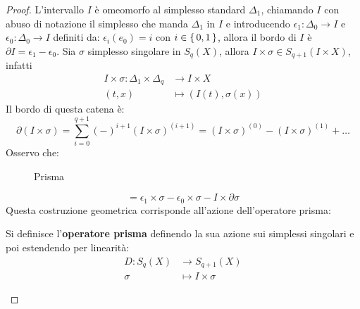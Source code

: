 \begin{proof}
  L'intervallo $ I $ è omeomorfo al simplesso standard $ \Delta_1 $, chiamando
  $ I $ con abuso di notazione il simplesso che manda $ \Delta_1 $ in $ I $ e
  introducendo $ \epsilon_1 \colon \Delta_0 \to I $ e
  $ \epsilon_0 \colon \Delta_0 \to I $ definiti da: $ \epsilon_i(e_0) = i $ con
  $ i \in \set{0,1} $, allora il bordo di $ I $ è
  $ \partial I = \epsilon_1 - \epsilon_0 $. Sia $ \sigma $ simplesso singolare in
  $ S_q(X) $, allora $ I \times \sigma \in S_{q+1}(I \times X) $, infatti
  \begin{align*}
    I \times \sigma \colon \Delta_1 \times \Delta_q & \to I \times X \\
    (t,x) & \mapsto (I(t), \sigma(x))
  \end{align*}
  Il bordo di questa catena è:
  \[
    \partial (I \times \sigma) = \sum_{i=0}^{q+1} (-)^{i+1}(I \times \sigma)^{(i+1)} = (I \times \sigma)^{(0)} - (I \times \sigma)^{(1)} + \dots
  \]
  Osservo che:
  \begin{figure}[htbp]
    \centering
    \caption{Prisma}
    \label{fig:lez14:prism}
  \end{figure}
  \[
    = \epsilon_1 \times \sigma - \epsilon_0 \times \sigma - I \times \partial \sigma
  \]
  Questa costruzione geometrica corrisponde all'azione dell'operatore prisma:
  \begin{definition}
    Si definisce l'\textbf{operatore prisma} definendo
    la sua azione sui simplessi singolari e poi estendendo per linearità:
    \begin{align*}
      D \colon S_q(X) & \to S_{q+1}(X) \\
      \sigma & \mapsto I \times \sigma
    \end{align*}
  \end{definition}

\end{proof}
